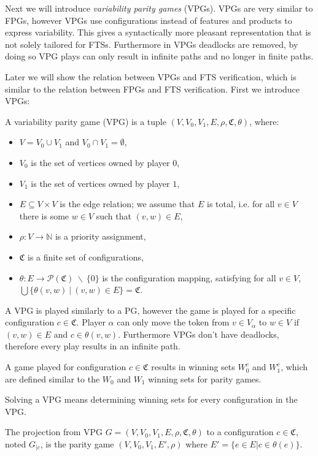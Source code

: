 Next we will introduce \textit{variability parity games} (VPGs). VPGs are very similar to FPGs, however VPGs use configurations instead of features and products to express variability. This gives a syntactically more pleasant representation that is not solely tailored for FTSs. Furthermore in VPGs deadlocks are removed, by doing so VPG plays can only result in infinite paths and no longer in finite paths.

Later we will show the relation between VPGs and FTS verification, which is similar to the relation between FPGs and FTS verification. First we introduce VPGs:
\begin{definition}
\label{def_VPG}
A variability parity game (VPG) is a tuple $(V,V_0, V_1, E, \rho, \mathfrak{C}, \theta)$, where:
\begin{itemize}
	\item $V = V_0 \cup V_1$ and $V_0 \cap V_1 = \emptyset$,
	\item $V_0$ is the set of vertices owned by player $0$,
	\item $V_1$ is the set of vertices owned by player $1$, 
	\item $E \subseteq V \times V$ is the edge relation; we assume that $E$ is total, i.e. for all $v\in V$ there is some $w \in V$ such that $(v,w) \in E$,
	\item $\rho :  V \rightarrow \mathbb{N}$ is a priority assignment,
	\item $\mathfrak{C}$ is a finite set of configurations,
	\item $\theta : E \rightarrow \mathcal{P}(\mathfrak{C})\ \backslash\ \{0\}$ is the configuration mapping, satisfying for all $v \in V$, $\bigcup\{\theta(v,w)\ |\ (v,w) \in E\} = \mathfrak{C}$.
\end{itemize}
\end{definition}
A VPG is played similarly to a PG, however the game is played for a specific configuration $c \in \mathfrak{C}$. Player $\alpha$ can only move the token from $v \in V_\alpha$ to $w \in V$ if $(v,w) \in E$ and $c \in \theta(v,w)$. Furthermore VPGs don't have deadlocks, therefore every play results in an infinite path.

A game played for configuration $c \in \mathfrak{C}$ results in winning sets $W_0^c$ and $W_1^c$, which are defined similar to the $W_0$ and $W_1$ winning sets for parity games.

Solving a VPG means determining winning sets for every configuration in the VPG.
\begin{definition}
\label{def_VPG_proj} The projection from VPG $G = (V, V_0, V_1, E, \rho, \mathfrak{C}, \theta)$ to a configuration $c \in \mathfrak{C}$, noted $G_{|c}$, is the parity game $(V, V_0, V_1, E', \rho)$ where $E' = \{ e\in E | c \in \theta(e)\}$.
\end{definition}

